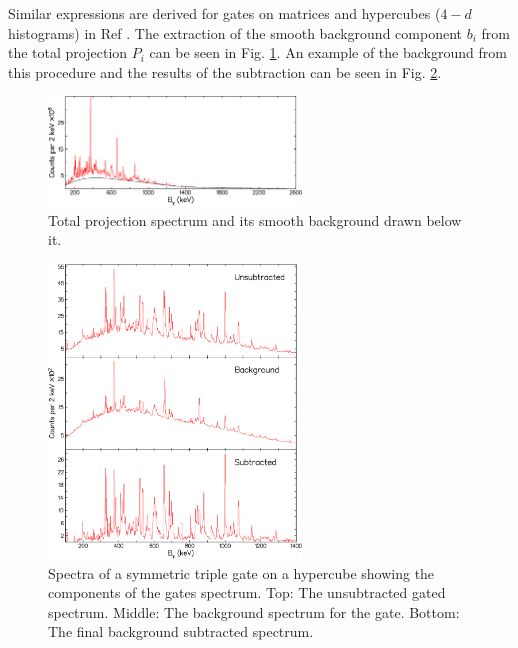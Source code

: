Similar expressions are derived for gates on matrices and hypercubes ($4-d$ histograms) in Ref \cite{symBGSub}. The extraction of the smooth background component $b_{i}$ from the total projection $P_{i}$ can be seen in  Fig. \ref{fig:chp3-smooth-bg}. An example of the background from this procedure and the results of the subtraction can be seen in Fig. \ref{fig:chp3-sym-bg-sub}. 
\begin{figure}[h!]
	\centerline{\includegraphics[width=0.6\textwidth]{./img/c3/smth_bg.eps}}
	\caption{Total projection spectrum and its smooth background drawn below it.}
	\label{fig:chp3-smooth-bg}
\end{figure}

\begin{figure}[h!]
	\centerline{\includegraphics[width=0.6\textwidth]{./img/c3/bg_sub_ex.eps}}
	\caption{Spectra of a symmetric triple gate on a hypercube showing the components of the gates spectrum. Top: The unsubtracted gated spectrum. Middle: The background spectrum for the gate. Bottom: The final background subtracted spectrum.}
	\label{fig:chp3-sym-bg-sub}
\end{figure}

